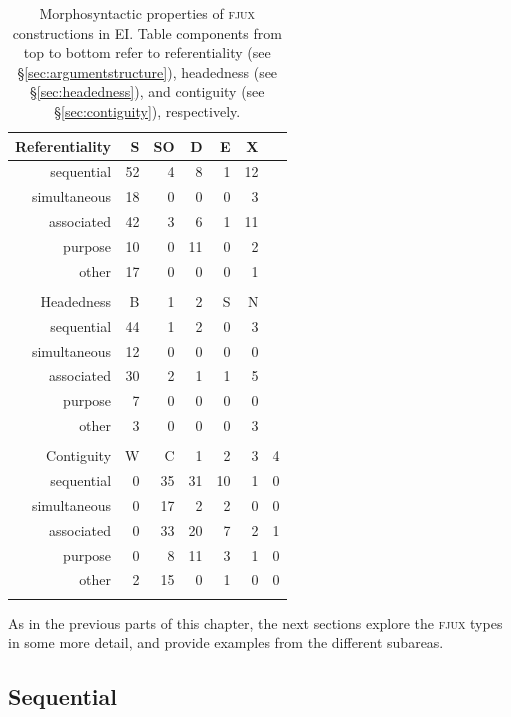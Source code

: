 \begin{table}
\centering
\begin{tabular}{rrrrrrr}
  \lsptoprule
Referentiality & S & SO & D & E & X \\ 
  \hline
  sequential &  52 &   4 &   8 &   1 &  12 \\ 
  simultaneous &  18 &   0 &   0 &   0 &   3 \\ 
  associated &  42 &   3 &   6 &   1 &  11 \\ 
  purpose &  10 &   0 &  11 &   0 &   2 \\ 
  other &  17 &   0 &   0 &   0 &   1 \\ 
   \hline
 \\
  \hline
Headedness & B & 1 & 2 & S & N \\ 
  \hline
  sequential &  44 &   1 &   2 &   0 &   3 \\ 
  simultaneous &  12 &   0 &   0 &   0 &   0 \\ 
  associated &  30 &   2 &   1 &   1 &   5 \\ 
  purpose &   7 &   0 &   0 &   0 &   0 \\ 
  other &   3 &   0 &   0 &   0 &   3 \\ 
   \hline
 \\
  \hline
Contiguity & W & C & 1 & 2 & 3 & 4 \\ 
  \hline
  sequential &   0 &  35 &  31 &  10 &   1 &   0 \\ 
  simultaneous &   0 &  17 &   2 &   2 &   0 &   0 \\ 
  associated &   0 &  33 &  20 &   7 &   2 &   1 \\ 
  purpose &   0 &   8 &  11 &   3 &   1 &   0 \\ 
  other &   2 &  15 &   0 &   1 &   0 &   0 \\ 
   \lspbottomrule
\end{tabular}
\caption[Morphosyntactic properties of \textsc{fjux} constructions]{Morphosyntactic properties of \textsc{fjux} constructions in EI. Table components from top to bottom refer to referentiality (see §\ref{sec:argumentstructure}), headedness (see §\ref{sec:headedness}), and contiguity (see §\ref{sec:contiguity}), respectively.}
\label{table:FJUX_formal}
\end{table}

As in the previous parts of this chapter, the next sections explore the \textsc{fjux} types in some more detail, and provide examples from the different subareas.

\subsection{Sequential}

